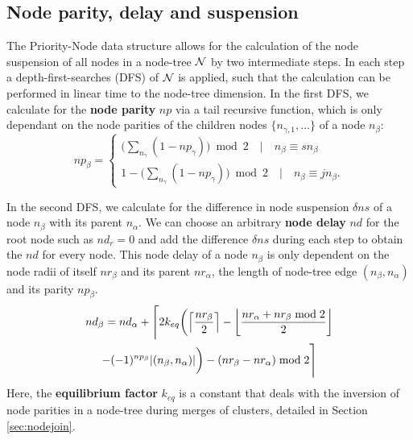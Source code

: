 \subsection{Node parity, delay and suspension}\label{sec:paritydelaysus}

The Priority-Node data structure allows for the calculation of the node suspension of all nodes in a node-tree $\mathcal{N}$ by two intermediate steps. In each step a depth-first-searches (DFS) of $\mathcal{N}$ is applied, such that the calculation can be performed in linear time to the node-tree dimension. In the first DFS, we calculate for the \textbf{node parity} $np$ via a tail recursive function, which is only dependant on the node parities of the children nodes $\{n_{\gamma,1}, ...\}$ of a node $n_\beta$:
\begin{equation}\label{eq:nodeparity}
np_\beta =
\begin{cases}
    \big( \sum_{n_\gamma} (1-np_\gamma) \big ) \bmod 2 \hspace{1em} | \hspace{1em} n_\beta \equiv sn_\beta \\
    1 - \big( \sum_{n_\gamma} (1-np_\gamma) \big ) \bmod 2 \hspace{1em} | \hspace{1em} n_\beta \equiv jn_\beta.
\end{cases} 
\end{equation}

In the second DFS, we calculate for the difference in node suspension $\delta ns$ of a node $n_\beta$ with its parent $n_\alpha$. We can choose an arbitrary \textbf{node delay} $nd$ for the root node such as $nd_r=0$ and add the difference $\delta ns$ during each step to obtain the $nd$ for every node. This node delay of a node $n_\beta$ is only dependent on the node radii of itself $nr_\beta$ and its parent $nr_\alpha$, the length of node-tree edge $(n_\beta, n_\alpha)$ and its parity $np_\beta$. 
\begin{multline}\label{eq:delayequation}
    nd_\beta = nd_\alpha + \Bigg \lceil 2k_{eq}\bigg(\ceil{\frac{nr_\beta}{2}} - \floor{\frac{nr_\alpha + nr_\beta \bmod 2}{2}}\\
    - (-1)^{np_\beta}\abs{(n_\beta,n_\alpha)}\bigg) - (nr_\beta - nr_\alpha) \bmod 2 \Bigg \rceil
\end{multline}
Here, the \textbf{equilibrium factor} $k_{eq}$ is a constant that deals with the inversion of node parities in a node-tree during merges of clusters, detailed in Section \ref{sec:nodejoin}. 

